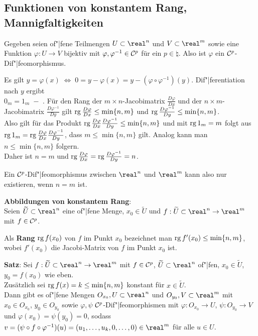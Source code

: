 \subsection{%
    Funktionen von konstantem Rang, Mannigfaltigkeiten%
}

Gegeben seien of"|fene Teilmengen $U \subset \real^n$ und $V \subset \real^m$
sowie eine Funktion $\varphi: U \rightarrow V$ bijektiv mit
$\varphi, \varphi^{-1} \in \mathcal{C}^p$ für ein $p \in \natural$.
Also ist $\varphi$ ein $\mathcal{C}^p$-Dif"|feomorphismus.

Es gilt $y = \varphi(x) \;\Leftrightarrow\; 0 = y - \varphi(x)
= y - (\varphi \circ \varphi^{-1})(y)$.
Dif"|ferentiation nach $y$ ergibt \\
$0_m = 1_m \;-$ .
Für den Rang der $m \times n$-Jacobimatrix $\frac{D \varphi}{Dx}$ und
der $n \times m$-Jacobimatrix $\frac{D \varphi^{-1}}{Dy}$ gilt
$\operatorname{rg} \frac{D \varphi}{Dx} \le \min\{n, m\}$ und
$\operatorname{rg} \frac{D \varphi^{-1}}{Dy} \le \min\{n, m\}$. \\
Also gilt für das Produkt
$\operatorname{rg} \frac{D \varphi}{Dx} \frac{D \varphi^{-1}}{Dy} \le \min\{n, m\}$
und mit $\operatorname{rg} 1_m = m$ folgt aus \\
$\operatorname{rg} 1_m = \operatorname{rg} \frac{D \varphi}{Dx} \frac{D \varphi^{-1}}{Dy}$, dass
$m \le \min\{n, m\}$ gilt.
Analog kann man $n \le \min\{n, m\}$ folgern. \\
Daher ist $n = m$ und
$\operatorname{rg} \frac{D \varphi}{Dx} = \operatorname{rg} \frac{D \varphi^{-1}}{Dy} = n$.

Ein $\mathcal{C}^p$-Dif"|feomorphismus zwischen $\real^n$ und $\real^m$ kann also
nur existieren, wenn $n = m$ ist.

\linie

\textbf{Abbildungen von konstantem Rang}: \\
Seien $\widetilde{U} \subset \real^n$ eine of"|fene Menge,
$x_0 \in \widetilde{U}$ und
$f: \widetilde{U} \subset \real^n \rightarrow \real^m$ mit $f \in \mathcal{C}^p$.

Als \textbf{Rang} $\operatorname{rg} f(x_0)$ von $f$ im Punkt $x_0$ bezeichnet man
$\operatorname{rg} f'(x_0) \le \min\{n, m\}$, wobei $f'(x_0)$ die Jacobi-Matrix von $f$
im Punkt $x_0$ ist.

\textbf{Satz}:
Sei $f: \widetilde{U} \subset \real^n \rightarrow \real^m$ mit
$f \in \mathcal{C}^p$, $\widetilde{U} \subset \real^n$ of"|fen,
$x_0 \in \widetilde{U}$, $y_0 = f(x_0)$ wie eben. \\
Zusätzlich sei $\operatorname{rg} f(x) = k \le \min\{n, m\}$ konstant für
$x \in \widetilde{U}$. \\
Dann gibt es of"|fene Mengen $O_{x_0}, U \subset \real^n$ und
$O_{y_0}, V \subset \real^m$ mit $x_0 \in O_{x_0}$, $y_0 \in O_{y_0}$ sowie
$\varphi, \psi$ $\mathcal{C}^p$-Dif"|feomorphismen mit
$\varphi: O_{x_0} \rightarrow U$,
$\psi: O_{y_0} \rightarrow V$ und
$\varphi(x_0) = \psi(y_0) = 0$, sodass
$v = (\psi \circ f \circ \varphi^{-1})(u) =
(u_1, \dotsc, u_k, 0, \dotsc, 0) \in \real^m$
für alle $u \in U$.

